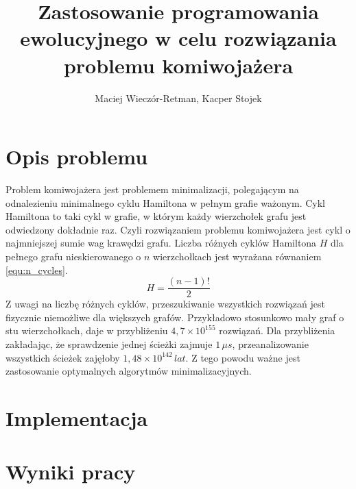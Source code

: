 \documentclass{article}
\title{Zastosowanie programowania ewolucyjnego w celu rozwiązania problemu
    komiwojażera}
\author{Maciej Wieczór-Retman, Kacper Stojek}
\date{} %
\begin{document}
\maketitle

\section{Opis problemu}

Problem komiwojażera jest problemem minimalizacji, polegającym na odnalezieniu
minimalnego cyklu Hamiltona w pełnym grafie ważonym. Cykl Hamiltona to taki cykl
w grafie, w którym każdy wierzchołek grafu jest odwiedzony dokładnie raz. Czyli
rozwiązaniem problemu komiwojażera jest cykl o najmniejszej sumie wag krawędzi
grafu. Liczba różnych cyklów Hamiltona $H$ dla pełnego grafu nieskierowanego o
$n$ wierzchołkach jest wyrażana równaniem \cref{equ:n_cycles}.
\begin{equation}
    H = \frac{\left(n - 1\right)!}{2}
    \label{equ:n_cycles}
\end{equation}
Z uwagi na liczbę różnych cyklów, przeszukiwanie wszystkich rozwiązań jest
fizycznie niemożliwe dla większych grafów. Przykładowo stosunkowo mały graf o
stu wierzchołkach, daje w przybliżeniu $4,7 \times  10^{155}$ rozwiązań. Dla
przybliżenia zakładając, że sprawdzenie jednej ścieżki zajmuje $1 \, \mu s$,
przeanalizowanie wszystkich ścieżek zajęłoby $1,48 \times  10^{142} \, lat$.
Z tego powodu ważne jest zastosowanie optymalnych algorytmów minimalizacyjnych.

\section{Implementacja}

\section{Wyniki pracy}
\end{document}
